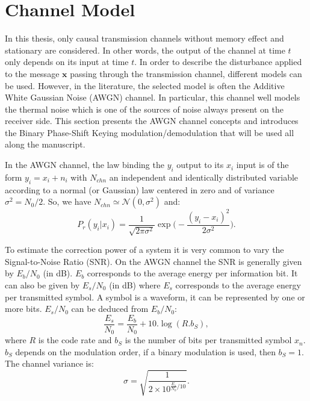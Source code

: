 \section{Channel Model}

In this thesis, only causal transmission channels without memory effect and
stationary are considered. In other words, the output of the channel at time $t$
only depends on its input at time $t$. In order to describe the disturbance
applied to the message $\bm{x}$ passing through the transmission channel,
different models can be used. However, in the literature, the selected model is
often the Additive White Gaussian Noise (AWGN) channel. In particular, this
channel well models the thermal noise which is one of the sources of noise
always present on the receiver side. This section presents the AWGN channel
concepts and introduces the Binary Phase-Shift Keying modulation/demodulation
that will be used all along the manuscript.

In the AWGN channel, the law binding the $y_i$ output to its $x_i$ input is of
the form $y_i = x_i + n_i$ with $N_{chn}$ an independent and identically
distributed variable according to a normal (or Gaussian) law centered in zero
and of variance $\sigma^2 = N_0 / 2$. So, we have $N_{chn} \simeq \mathcal{N}(0,
\sigma^2)$ and:
\begin{equation}
P_r(y_i|x_i) = \frac{1}{\sqrt{2\pi\sigma^2}}\exp{\Big(-\frac{(y_i-x_i)^2}{2\sigma^2}\Big)}.
\end{equation}

To estimate the correction power of a system it is very common to vary the
Signal-to-Noise Ratio (SNR). On the AWGN channel the SNR is generally given by
$E_b/N_0$ (in dB). $E_b$ corresponds to the average energy per information bit.
It can also be given by $E_s/N_0$ (in dB) where $E_s$ corresponds to the average
energy per transmitted symbol. A symbol is a waveform, it can be represented by
one or more bits. $E_s/N_0$ can be deduced from $E_b/N_0$:
\begin{equation}
\frac{E_s}{N_0} = \frac{E_b}{N_0} + 10.\log{(R.b_S)},
\end{equation}
where $R$ is the code rate and $b_S$ is the number of bits per transmitted
symbol $x_n$. $b_S$ depends on the modulation order, if a binary modulation is
used, then $b_S = 1$. The channel variance is:
\begin{equation}
\sigma = \sqrt{\frac{1}{2 \times 10^{\frac{E_s}{N_0} / 10}}}.
\end{equation}

